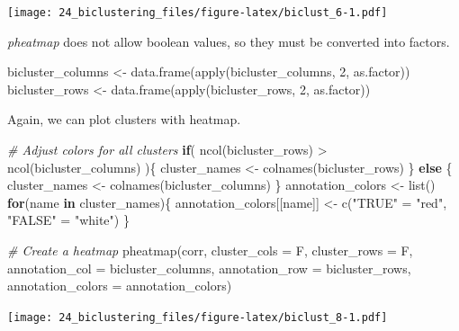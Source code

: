 \documentclass[
]{book}
\newenvironment{Shaded}{\begin{snugshade}}{\end{snugshade}}
\newcommand{\AttributeTok}[1]{\textcolor[rgb]{0.77,0.63,0.00}{#1}}
\newcommand{\CommentTok}[1]{\textcolor[rgb]{0.56,0.35,0.01}{\textit{#1}}}
\newcommand{\ControlFlowTok}[1]{\textcolor[rgb]{0.13,0.29,0.53}{\textbf{#1}}}
\newcommand{\DecValTok}[1]{\textcolor[rgb]{0.00,0.00,0.81}{#1}}
\newcommand{\FunctionTok}[1]{\textcolor[rgb]{0.00,0.00,0.00}{#1}}
\newcommand{\NormalTok}[1]{#1}
\newcommand{\OtherTok}[1]{\textcolor[rgb]{0.56,0.35,0.01}{#1}}
\newcommand{\SpecialCharTok}[1]{\textcolor[rgb]{0.00,0.00,0.00}{#1}}
\newcommand{\StringTok}[1]{\textcolor[rgb]{0.31,0.60,0.02}{#1}}
\begin{document}
\texttt{[image: 24\_biclustering\_files/figure-latex/biclust\_6-1.pdf]}

\emph{pheatmap} does not allow boolean values, so they must be converted into factors.

\begin{Shaded}
\begin{Highlighting}[]
\NormalTok{bicluster\_columns }\OtherTok{\textless{}{-}} \FunctionTok{data.frame}\NormalTok{(}\FunctionTok{apply}\NormalTok{(bicluster\_columns, }\DecValTok{2}\NormalTok{, as.factor))}
\NormalTok{bicluster\_rows }\OtherTok{\textless{}{-}} \FunctionTok{data.frame}\NormalTok{(}\FunctionTok{apply}\NormalTok{(bicluster\_rows, }\DecValTok{2}\NormalTok{, as.factor))}
\end{Highlighting}
\end{Shaded}

Again, we can plot clusters with heatmap.

\begin{Shaded}
\begin{Highlighting}[]
\CommentTok{\# Adjust colors for all clusters}
\ControlFlowTok{if}\NormalTok{( }\FunctionTok{ncol}\NormalTok{(bicluster\_rows) }\SpecialCharTok{\textgreater{}} \FunctionTok{ncol}\NormalTok{(bicluster\_columns) )\{}
\NormalTok{  cluster\_names }\OtherTok{\textless{}{-}} \FunctionTok{colnames}\NormalTok{(bicluster\_rows)}
\NormalTok{\} }\ControlFlowTok{else}\NormalTok{ \{}
\NormalTok{  cluster\_names }\OtherTok{\textless{}{-}} \FunctionTok{colnames}\NormalTok{(bicluster\_columns)}
\NormalTok{\}}
\NormalTok{annotation\_colors }\OtherTok{\textless{}{-}} \FunctionTok{list}\NormalTok{()}
\ControlFlowTok{for}\NormalTok{(name }\ControlFlowTok{in}\NormalTok{ cluster\_names)\{}
\NormalTok{  annotation\_colors[[name]] }\OtherTok{\textless{}{-}} \FunctionTok{c}\NormalTok{(}\StringTok{"TRUE"} \OtherTok{=} \StringTok{"red"}\NormalTok{, }\StringTok{"FALSE"} \OtherTok{=} \StringTok{"white"}\NormalTok{)}
\NormalTok{\}}

\CommentTok{\# Create a heatmap}
\FunctionTok{pheatmap}\NormalTok{(corr, }\AttributeTok{cluster\_cols =}\NormalTok{ F, }\AttributeTok{cluster\_rows =}\NormalTok{ F,}
         \AttributeTok{annotation\_col =}\NormalTok{ bicluster\_columns, }
         \AttributeTok{annotation\_row =}\NormalTok{ bicluster\_rows,}
         \AttributeTok{annotation\_colors =}\NormalTok{ annotation\_colors)}
\end{Highlighting}
\end{Shaded}

\texttt{[image: 24\_biclustering\_files/figure-latex/biclust\_8-1.pdf]}
\end{document}
